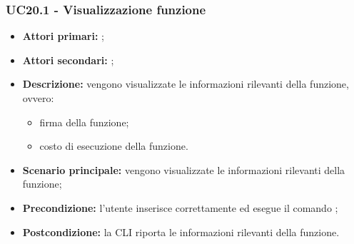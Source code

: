 \subsubsection{UC20.1 - Visualizzazione funzione }
\begin{itemize}
	\item \textbf{Attori primari:} \ua{};
	\item \textbf{Attori secondari:} \re{};
	\item \textbf{Descrizione:} vengono visualizzate le informazioni rilevanti della funzione, ovvero:
	\begin{itemize}
		\item firma della funzione;
		\item costo di esecuzione della funzione.
	\end{itemize}
	\item \textbf{Scenario principale:} vengono visualizzate le informazioni rilevanti della funzione;
	\item \textbf{Precondizione:} l'utente inserisce correttamente ed esegue il comando \lista{};
	\item \textbf{Postcondizione:} la CLI riporta le informazioni rilevanti della funzione.  
\end{itemize}